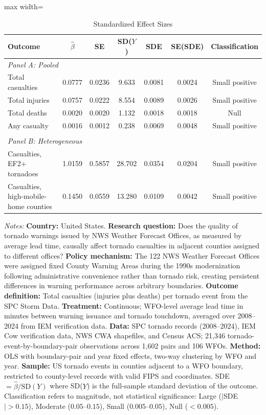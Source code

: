 \begin{table}[t]
\centering
\caption{Standardized Effect Sizes}
\label{tab:sde}
\begin{adjustbox}{max width=\textwidth}
\begin{tabular}{lcccccc}
\hline\hline
Outcome & $\hat{\beta}$ & SE & SD($Y$) & SDE & SE(SDE) & Classification \\
\hline
\multicolumn{7}{l}{\textit{Panel A: Pooled}} \\[3pt]
Total casualties & 0.0777 & 0.0236 & 9.633 & 0.0081 & 0.0024 & Small positive \\
Total injuries & 0.0757 & 0.0222 & 8.554 & 0.0089 & 0.0026 & Small positive \\
Total deaths & 0.0020 & 0.0020 & 1.132 & 0.0018 & 0.0018 & Null \\
Any casualty & 0.0016 & 0.0012 & 0.238 & 0.0069 & 0.0048 & Small positive \\
\\
\multicolumn{7}{l}{\textit{Panel B: Heterogeneous}} \\[3pt]
Casualties, EF2+ tornadoes & 1.0159 & 0.5857 & 28.702 & 0.0354 & 0.0204 & Small positive \\
Casualties, high-mobile-home counties & 0.1450 & 0.0559 & 13.280 & 0.0109 & 0.0042 & Small positive \\
\hline\hline
\end{tabular}
\end{adjustbox}
\begin{tablenotes}[flushleft]\footnotesize
\item \textit{Notes:} \textbf{Country:} United States. \textbf{Research question:} Does the quality of tornado warnings issued by NWS Weather Forecast Offices, as measured by average lead time, causally affect tornado casualties in adjacent counties assigned to different offices? \textbf{Policy mechanism:} The 122 NWS Weather Forecast Offices were assigned fixed County Warning Areas during the 1990s modernization following administrative convenience rather than tornado risk, creating persistent differences in warning performance across arbitrary boundaries. \textbf{Outcome definition:} Total casualties (injuries plus deaths) per tornado event from the SPC Storm Data. \textbf{Treatment:} Continuous; WFO-level average lead time in minutes between warning issuance and tornado touchdown, averaged over 2008--2024 from IEM verification data. \textbf{Data:} SPC tornado records (2008--2024), IEM Cow verification data, NWS CWA shapefiles, and Census ACS; 21,346 tornado-event-by-boundary-pair observations across 1,602 pairs and 106 WFOs. \textbf{Method:} OLS with boundary-pair and year fixed effects, two-way clustering by WFO and year. \textbf{Sample:} US tornado events in counties adjacent to a WFO boundary, restricted to county-level records with valid FIPS and coordinates. SDE $= \hat{\beta} / \text{SD}(Y)$ where SD($Y$) is the full-sample standard deviation of the outcome. Classification refers to magnitude, not statistical significance: Large ($|$SDE$| > 0.15$), Moderate ($0.05$--$0.15$), Small ($0.005$--$0.05$), Null ($< 0.005$).
\end{tablenotes}
\end{table}
